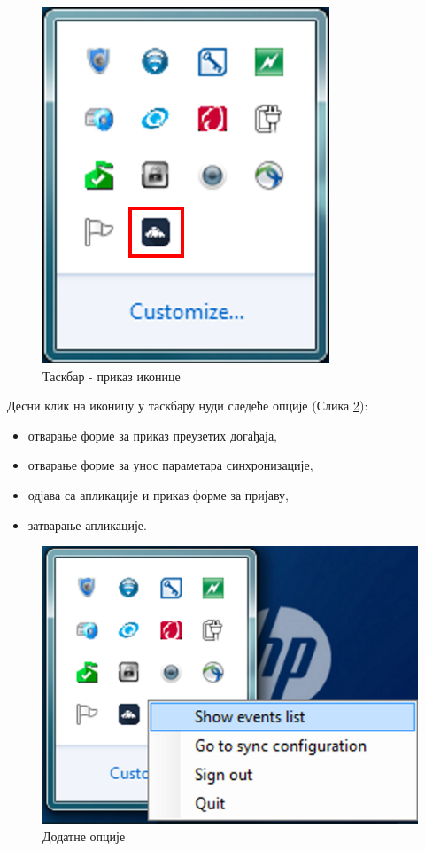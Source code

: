 \begin{figure}[H]
	\centering
	\includegraphics[scale=0.5]{slike/ApplicationIcon.png}
	\caption{Таскбар - приказ иконице}
	\label{fig:application_icon}
\end{figure}

Десни клик на иконицу у таскбару нуди следеће опције (Слика \ref{fig:icon_right_click}):
\begin{itemize}
	\item{отварање форме за приказ преузетих догађаја},
	\item{отварање форме за унос параметара синхронизације},
	\item{одјава са апликације и приказ форме за пријаву},
	\item{затварање апликације}.
\end{itemize}

\begin{figure}[H]
	\centering
	\includegraphics[scale=0.5]{slike/IconRightClick.png}
	\caption{Додатне опције}
	\label{fig:icon_right_click}
\end{figure}

